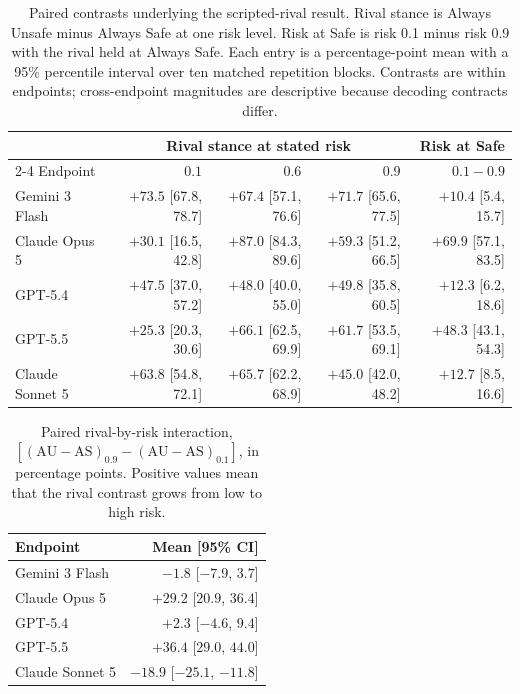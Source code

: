 \documentclass[sigconf,anonymous]{aamas}
\begin{document}
\begin{table}[t]
    \caption{Paired contrasts underlying the scripted-rival result. Rival
    stance is Always Unsafe minus Always Safe at one risk level. Risk at Safe
    is risk 0.1 minus risk 0.9 with the rival held at Always Safe. Each entry is
    a percentage-point mean with a 95\% percentile interval over ten matched
    repetition blocks. Contrasts are within endpoints; cross-endpoint magnitudes
    are descriptive because decoding contracts differ.}
    \label{tab:scripted-opponent-contrasts}
    \centering
    \footnotesize
    \setlength{\tabcolsep}{4.5pt}
    \begin{tabular}{@{}lrrrr@{}}
        \toprule
        & \multicolumn{3}{c}{Rival stance at stated risk} & Risk at Safe \\
        \cmidrule(lr){2-4}
        Endpoint & $0.1$ & $0.6$ & $0.9$ & $0.1-0.9$ \\
        \midrule
        Gemini 3 Flash  & $+73.5$ [67.8, 78.7] & $+67.4$ [57.1, 76.6] & $+71.7$ [65.6, 77.5] & $+10.4$ [5.4, 15.7] \\
        Claude Opus 5   & $+30.1$ [16.5, 42.8] & $+87.0$ [84.3, 89.6] & $+59.3$ [51.2, 66.5] & $+69.9$ [57.1, 83.5] \\
        GPT-5.4         & $+47.5$ [37.0, 57.2] & $+48.0$ [40.0, 55.0] & $+49.8$ [35.8, 60.5] & $+12.3$ [6.2, 18.6] \\
        GPT-5.5         & $+25.3$ [20.3, 30.6] & $+66.1$ [62.5, 69.9] & $+61.7$ [53.5, 69.1] & $+48.3$ [43.1, 54.3] \\
        Claude Sonnet 5 & $+63.8$ [54.8, 72.1] & $+65.7$ [62.2, 68.9] & $+45.0$ [42.0, 48.2] & $+12.7$ [8.5, 16.6] \\
        \bottomrule
    \end{tabular}
\end{table}

\begin{table}[t]
    \caption{Paired rival-by-risk interaction,
    $[(\mathrm{AU}-\mathrm{AS})_{0.9}-(\mathrm{AU}-\mathrm{AS})_{0.1}]$, in
    percentage points. Positive values mean that the rival contrast grows from
    low to high risk.}
    \label{tab:scripted-opponent-interaction}
    \centering
    \footnotesize
    \begin{tabular}{@{}lr@{}}
        \toprule
        Endpoint & Mean [95\% CI] \\
        \midrule
        Gemini 3 Flash  & $-1.8$ [$-7.9$, $3.7$] \\
        Claude Opus 5   & $+29.2$ [$20.9$, $36.4$] \\
        GPT-5.4         & $+2.3$ [$-4.6$, $9.4$] \\
        GPT-5.5         & $+36.4$ [$29.0$, $44.0$] \\
        Claude Sonnet 5 & $-18.9$ [$-25.1$, $-11.8$] \\
        \bottomrule
    \end{tabular}
\end{table}
\end{document}
